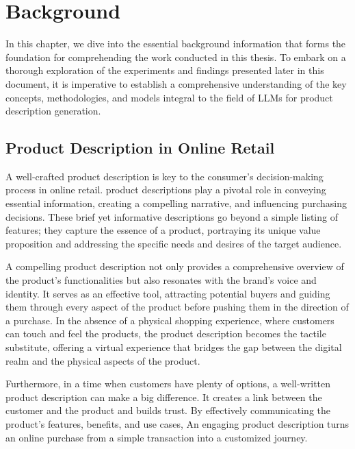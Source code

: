 \chapter{Background}\label{chap:background}

In this chapter, we dive into the essential background information that forms the foundation for comprehending the work conducted in this thesis. To embark on a thorough exploration of the experiments and findings presented later in this document, it is imperative to establish a comprehensive understanding of the key concepts, methodologies, and models integral to the field of LLMs for product description generation.
\section{Product Description in Online Retail}

A well-crafted product description is key to the consumer's decision-making process in online retail. product descriptions play a pivotal role in conveying essential information, creating a compelling narrative, and influencing purchasing decisions. These brief yet informative descriptions go beyond a simple listing of features; they capture the essence of a product, portraying its unique value proposition and addressing the specific needs and desires of the target audience.

A compelling product description not only provides a comprehensive overview of the product's functionalities but also resonates with the brand's voice and identity. It serves as an effective tool, attracting potential buyers and guiding them through every aspect of the product before pushing them in the direction of a purchase. In the absence of a physical shopping experience, where customers can touch and feel the products, the product description becomes the tactile substitute, offering a virtual experience that bridges the gap between the digital realm and the physical aspects of the product.

Furthermore, in a time when customers have plenty of options, a well-written product description can make a big difference. It creates a link between the customer and the product and builds trust. By effectively communicating the product's features, benefits, and use cases, An engaging product description turns an online purchase from a simple transaction into a customized journey.


